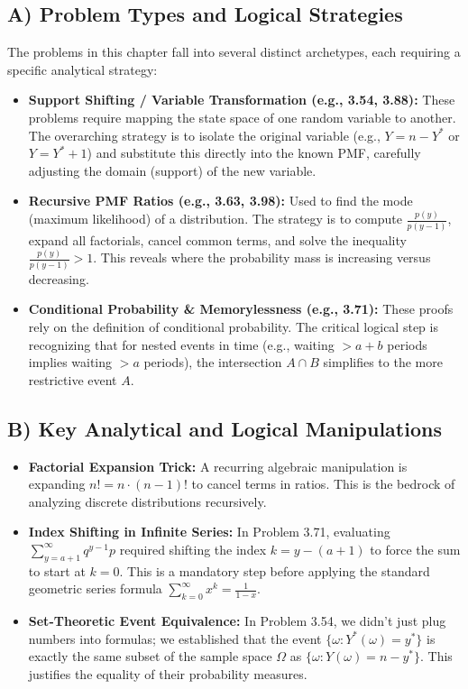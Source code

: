 \documentclass[11pt, letterpaper]{article}
\theoremstyle{definition}
\theoremstyle{remark}
\begin{document}
\subsection{A) Problem Types and Logical Strategies}
The problems in this chapter fall into several distinct archetypes, each requiring a specific analytical strategy:
\begin{itemize}
    \item \textbf{Support Shifting / Variable Transformation (e.g., 3.54, 3.88):} These problems require mapping the state space of one random variable to another. The overarching strategy is to isolate the original variable (e.g., $Y = n - Y^*$ or $Y = Y^* + 1$) and substitute this directly into the known PMF, carefully adjusting the domain (support) of the new variable.
    \item \textbf{Recursive PMF Ratios (e.g., 3.63, 3.98):} Used to find the mode (maximum likelihood) of a distribution. The strategy is to compute $\frac{p(y)}{p(y-1)}$, expand all factorials, cancel common terms, and solve the inequality $\frac{p(y)}{p(y-1)} > 1$. This reveals where the probability mass is increasing versus decreasing.
    \item \textbf{Conditional Probability \& Memorylessness (e.g., 3.71):} These proofs rely on the definition of conditional probability. The critical logical step is recognizing that for nested events in time (e.g., waiting $> a+b$ periods implies waiting $> a$ periods), the intersection $A \cap B$ simplifies to the more restrictive event $A$.
\end{itemize}

\subsection{B) Key Analytical and Logical Manipulations}
\begin{itemize}
    \item \textbf{Factorial Expansion Trick:} A recurring algebraic manipulation is expanding $n! = n \cdot (n-1)!$ to cancel terms in ratios. This is the bedrock of analyzing discrete distributions recursively.
    \item \textbf{Index Shifting in Infinite Series:} In Problem 3.71, evaluating $\sum_{y=a+1}^\infty q^{y-1} p$ required shifting the index $k = y - (a+1)$ to force the sum to start at $k=0$. This is a mandatory step before applying the standard geometric series formula $\sum_{k=0}^\infty x^k = \frac{1}{1-x}$.
    \item \textbf{Set-Theoretic Event Equivalence:} In Problem 3.54, we didn't just plug numbers into formulas; we established that the event $\{\omega : Y^*(\omega) = y^*\}$ is exactly the same subset of the sample space $\Omega$ as $\{\omega : Y(\omega) = n - y^*\}$. This justifies the equality of their probability measures.
\end{itemize}
\end{document}
